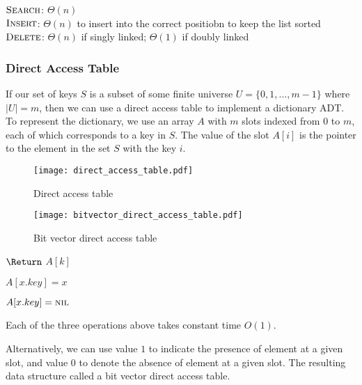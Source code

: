 $\textsc{Search}$: $\Theta(n)$ \\
$\textsc{Insert}$: $\Theta(n)$ to insert into the correct positiobn to keep the list sorted \\
$\textsc{Delete}$: $\Theta(n)$ if singly linked; $\Theta(1)$ if doubly linked

\subsubsection{Direct Access Table} 

If our set of keys $S$ is a subset of some finite universe $U = \{ 0, 1, \ldots, m-1 \}$ where $|U| = m$, then we can use a direct access table to implement a dictionary ADT. To represent the dictionary, we use an array $A$ with $m$ slots indexed from 0 to $m$, each of which corresponds to a key in $S$. The value of the slot $A[i]$ is the pointer to the element in the set $S$ with the key $i$.

\begin{figure}[htbp]
    \texttt{[image: direct\_access\_table.pdf]}
    \caption{Direct access table}
    \label{fig:direct_access_table}
\end{figure}

\begin{figure}[htbp]
    \texttt{[image: bitvector\_direct\_access\_table.pdf]}
    \caption{Bit vector direct access table}
    \label{fig:bitvector_direct_access_table}
\end{figure}

\begin{codebox}
    \li $\Return$ $A[k]$
\end{codebox}

\begin{codebox}
    \li $A[x.key] = x$
\end{codebox}

\begin{codebox}
    \li $A[x.key] = \textsc{nil}$
\end{codebox}

Each of the three operations above takes constant time $O(1)$.

Alternatively, we can use value $1$ to indicate the presence of element at a given slot, and value $0$ to denote the absence of element at a given slot. The resulting data structure called a bit vector direct access table. 